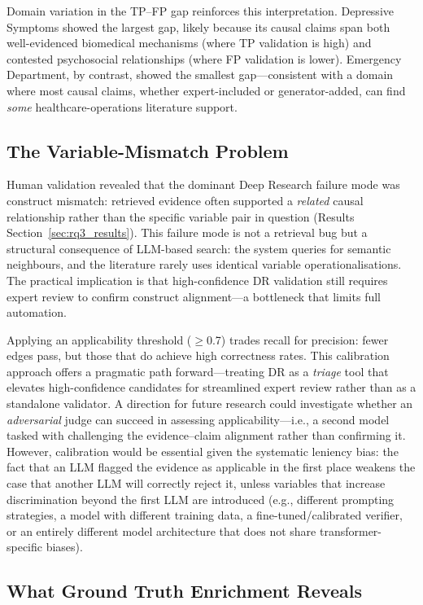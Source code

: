 Domain variation in the TP--FP gap reinforces this interpretation. Depressive Symptoms showed the largest gap, likely because its causal claims span both well-evidenced biomedical mechanisms (where TP validation is high) and contested psychosocial relationships (where FP validation is lower). Emergency Department, by contrast, showed the smallest gap---consistent with a domain where most causal claims, whether expert-included or generator-added, can find \emph{some} healthcare-operations literature support.

\subsection{The Variable-Mismatch Problem}

Human validation revealed that the dominant Deep Research failure mode was construct mismatch: retrieved evidence often supported a \emph{related} causal relationship rather than the specific variable pair in question (Results Section~\ref{sec:rq3_results}). This failure mode is not a retrieval bug but a structural consequence of LLM-based search: the system queries for semantic neighbours, and the literature rarely uses identical variable operationalisations. The practical implication is that high-confidence DR validation still requires expert review to confirm construct alignment---a bottleneck that limits full automation.

Applying an applicability threshold ($\geq$0.7) trades recall for precision: fewer edges pass, but those that do achieve high correctness rates. This calibration approach offers a pragmatic path forward---treating DR as a \emph{triage} tool that elevates high-confidence candidates for streamlined expert review rather than as a standalone validator. A direction for future research could investigate whether an \emph{adversarial} judge can succeed in assessing applicability---i.e., a second model tasked with challenging the evidence--claim alignment rather than confirming it. However, calibration would be essential given the systematic leniency bias: the fact that an LLM flagged the evidence as applicable in the first place weakens the case that another LLM will correctly reject it, unless variables that increase discrimination beyond the first LLM are introduced (e.g., different prompting strategies, a model with different training data, a fine-tuned/calibrated verifier, or an entirely different model architecture that does not share transformer-specific biases).

\subsection{What Ground Truth Enrichment Reveals}

